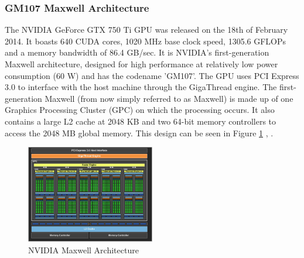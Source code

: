 \subsubsection{GM107 Maxwell Architecture}\label{gpu:ssec:max}
The NVIDIA GeForce GTX 750 Ti GPU was released on the 18th of February 2014. It boasts 640 CUDA cores, 1020 MHz base clock speed, 1305.6 GFLOPs and a memory bandwidth of 86.4 GB/sec. It is NVIDIA's first-generation Maxwell architecture, designed for high performance at relatively low power consumption (60 W) and has the codename 'GM107'. The GPU uses PCI Express 3.0 to interface with the host machine through the GigaThread engine. The first-generation Maxwell (from now simply referred to as Maxwell) is made up of one Graphics Processing Cluster (GPC) on which the processing occurs. It also contains a large L2 cache at 2048 KB and two 64-bit memory controllers to access the 2048 MB global memory. This design can be seen in Figure \ref{gpu:img:gm107} \citep{geforce_750}, \citep{g750_paper}.
%
\begin{figure}[H]
 \centering
 \includegraphics[width=0.5\textwidth]{Images/GM107.jpg}
 \caption[]{NVIDIA Maxwell Architecture\footnotemark}
 \label{gpu:img:gm107}
\end{figure}
%

